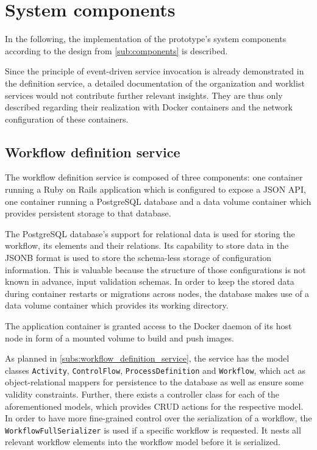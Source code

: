 
\section{System components} %
\label{sec:components_implementation}
    In the following, the implementation of the prototype's system components according to the design from  \ref{sub:components} is described.

    Since the principle of event-driven service invocation is already demonstrated in the definition service, a detailed documentation of the organization and worklist services would not contribute further relevant insights. They are thus only described regarding their realization with Docker containers and the network configuration of these containers.

  \subsection{Workflow definition service} %
    \label{sub:workflow_definition_service}

    The workflow definition service is composed of three components: one container running a Ruby on Rails application which is configured to expose a JSON API, one container running a PostgreSQL database and a data volume container which provides persistent storage to that database.

    The PostgreSQL database's support for relational data is used for storing the workflow, its elements and their relations. Its capability to store data in the JSONB format is used to store the schema-less storage of configuration information. This is valuable because the structure of those configurations is not known in advance, \eg input validation schemas.
    In order to keep the stored data during container restarts or migrations across nodes, the database makes use of a data volume container which provides its working directory.

    The application container is granted access to the Docker daemon of its host node in form of a mounted volume to build and push images.

    As planned in \ref{subs:workflow_definition_service}, the service has the model classes \texttt{Activity}, \texttt{ControlFlow}, \texttt{ProcessDefinition} and \texttt{Workflow}, which act as object-relational mappers for persistence to the database as well as ensure some validity constraints. Further, there exists a controller class for each of the aforementioned models, which provides \ac{CRUD} actions for the respective model. In order to have more fine-grained control over the serialization of a workflow, the \texttt{WorkflowFullSerializer} is used if a specific workflow is requested. It nests all relevant workflow elements into the workflow model before it is serialized.


